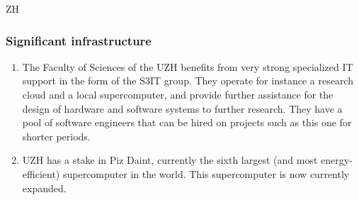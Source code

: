 \begin{sitedescription}{ZH}
\subsubsection*{Significant infrastructure}
\begin{enumerate}
\item The Faculty of Sciences of the UZH benefits from very strong specialized IT support in the form of the S3IT group. They operate for instance a research cloud and a local supercomputer,  and provide further assistance for the design of hardware and software systems to further research. They have a pool of software engineers that can be hired on projects such as this one for shorter periods.
\item UZH has a stake in Piz Daint, currently the sixth largest (and most energy-efficient) supercomputer in the world. This supercomputer is now currently expanded. 
\end{enumerate}
\end{sitedescription}
